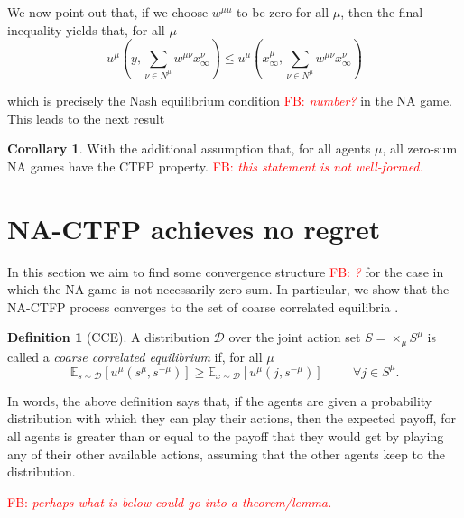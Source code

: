 \documentclass{article}
\theoremstyle{definition}
\newtheorem{definition}{Definition}
\newtheorem{corollary}{Corollary}
\newcommand{\fb}[1]{\textcolor{red}{FB: \textit{#1}}}
\newcommand{\wmunu}{w^{\mu \nu}}
\newcommand{\xmu}{x^{\mu}}
\newcommand{\xnu}{x^{\nu}}
\begin{document}
  We now point out that, if we choose $w^{\mu \mu}$ to be zero for all $\mu$, then the final inequality yields that, for all $\mu$
%
  \begin{equation}
    u^\mu(y, \sum_{\nu \in N^\mu} \wmunu \xnu_\infty) \leq u^\mu(\xmu_\infty, \sum_{\nu \in N^\mu} \wmunu \xnu_\infty)
  \end{equation}

  which is precisely the Nash equilibrium condition \fb{number?} in the NA game. This leads to the next result
%
  \begin{corollary}
    With the additional assumption that, for all agents $\mu$, all zero-sum NA games have the CTFP property. \fb{this statement is not well-formed.}
  \end{corollary}

\section{NA-CTFP achieves no regret}
  \label{sec::CCEConvergence}

  In this section we aim to find some convergence structure \fb{?} for the
  case in which the NA game is not necessarily zero-sum. In
  particular, we show that the NA-CTFP process converges to the set of
  coarse correlated equilibria \cite{Nisan2007}.
  \begin{definition}[CCE]
    A distribution $\mathcal{D}$ over the joint action set $S =
    \times_\mu S^\mu$ is called a \emph{coarse correlated equilibrium}
     if, for all $\mu$
    \begin{equation}
      \mathbb{E}_{s \sim \mathcal{D}}[u^\mu (s^\mu, s^{- \mu})] \geq
      \mathbb{E}_{x \sim \mathcal{D}}[u^\mu (j, s^{-
          \mu})] \hspace{1cm} \forall j \in S^\mu.
    \end{equation}
  \end{definition}

  In words, the above definition says that, if the agents are given a
  probability distribution with which they can play their actions, then
  the expected payoff, for all agents is greater than or equal to the
  payoff that they would get by playing any of their other available
  actions, assuming that the other agents keep to the distribution.

  \fb{perhaps what is below could go into a theorem/lemma.}
  
\end{document}
